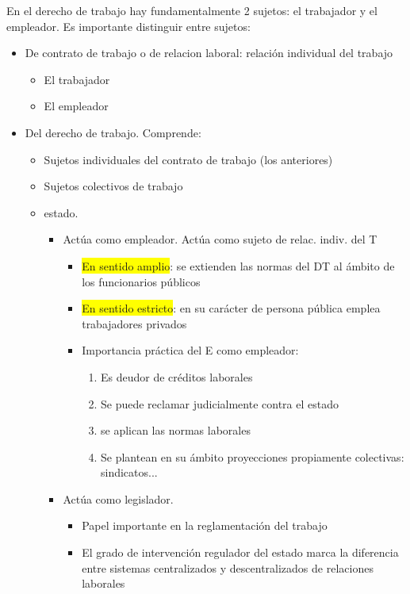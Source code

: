\documentclass[spanish,12pt,a4paper,titlepage]{report}
\newcommand{\highlight}[1]{\colorbox{yellow}{#1}}    %
\begin{document}
En el derecho de trabajo hay fundamentalmente 2 sujetos: el trabajador y el empleador. Es importante distinguir entre sujetos:

\begin{itemize}
\item De contrato de trabajo o de relacion laboral: relación individual del trabajo
\begin{itemize}
	\item El trabajador
	\item El empleador 
\end{itemize}
\item Del derecho de trabajo. Comprende:
	\begin{itemize}
		\item Sujetos individuales del contrato de trabajo (los anteriores)
		\item Sujetos colectivos de trabajo
		\item estado. 
		\begin{itemize}
			\item Actúa como empleador. Actúa como sujeto de relac. indiv. del T
			\begin{itemize}
				\item \highlight{En sentido amplio}: se extienden las normas del DT al ámbito de los funcionarios públicos
				\item \highlight{En sentido estricto}: en su carácter de persona pública emplea trabajadores privados
				\item Importancia práctica del E como empleador: 
				\begin{enumerate}
					\item Es deudor de créditos laborales
					\item Se puede reclamar judicialmente contra el estado
					\item se aplican las normas laborales
					\item Se plantean en su ámbito proyecciones propiamente colectivas: sindicatos...
				\end{enumerate}
			\end{itemize}
			\item Actúa como legislador. 
			\begin{itemize}
				\item Papel importante en la reglamentación del trabajo
				\item El grado de intervención regulador del estado marca la diferencia entre sistemas centralizados y descentralizados de relaciones laborales
			\end{itemize}

\end{itemize}
\end{itemize}
\end{itemize}
\end{document}
